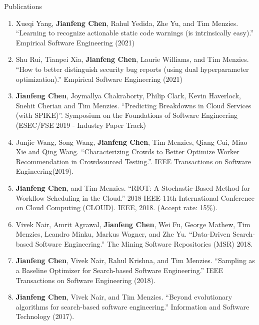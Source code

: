 \documentclass{resume} %
\begin{document}
\begin{rSection}{ Publications} 
\begin{enumerate}[wide, labelwidth=!, labelindent=0pt]
\item Xueqi Yang, \textbf{Jianfeng Chen}, Rahul Yedida, Zhe Yu, and Tim Menzies. ``Learning to recognize actionable static code warnings (is intrinsically easy).'' Empirical Software Engineering (2021)

\item Shu Rui, Tianpei Xia, \textbf{Jianfeng Chen}, Laurie Williams, and Tim Menzies. ``How to better distinguish security bug reports (using dual hyperparameter optimization).'' Empirical Software Engineering (2021)

\item \textbf{Jianfeng Chen}, Joymallya Chakraborty, Philip Clark, Kevin Haverlock, Snehit Cherian and Tim Menzies. ``Predicting Breakdowns in Cloud Services (with SPIKE)''. Symposium on the Foundations of Software Engineering (ESEC/FSE 2019 - Industry Paper Track)
\item Junjie Wang, Song Wang, \textbf{Jianfeng Chen}, Tim Menzies, Qiang Cui, Miao Xie and  Qing Wang. ``Characterizing Crowds to Better Optimize Worker Recommendation in Crowdsourced Testing.''. IEEE Transactions on Software Engineering(2019).
\item \textbf{Jianfeng Chen}, and Tim Menzies. ``RIOT: A Stochastic-Based Method for Workflow Scheduling in the Cloud.'' 2018 IEEE 11th International Conference on Cloud Computing (CLOUD). IEEE, 2018. (Accept rate: 15\%).
\item Vivek Nair, Amrit Agrawal, \textbf{Jianfeng Chen}, Wei Fu, George Mathew, Tim Menzies, Leandro Minku, Markus Wagner, and Zhe Yu. ``Data-Driven Search-based Software Engineering.'' The Mining Software Repositories (MSR) 2018.

\item \textbf{Jianfeng Chen}, Vivek Nair, Rahul Krishna, and Tim Menzies. ``Sampling as a Baseline Optimizer for Search-based Software Engineering.'' IEEE Transactions on Software Engineering (2018).
\item \textbf{Jianfeng Chen}, Vivek Nair, and Tim Menzies. ``Beyond evolutionary algorithms for search-based software engineering.'' Information and Software Technology (2017).


\end{enumerate}
\end{rSection}
\end{document}
